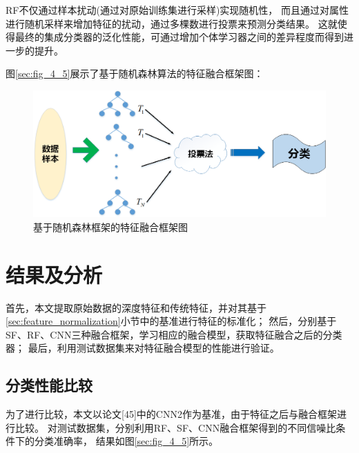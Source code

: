 RF不仅通过样本扰动(通过对原始训练集进行采样)实现随机性，
而且通过对属性进行随机采样来增加特征的扰动，通过多棵数进行投票来预测分类结果。
这就使得最终的集成分类器的泛化性能，可通过增加个体学习器之间的差异程度而得到进一步的提升。\par
图\ref{sec:fig_4_5}展示了基于随机森林算法的特征融合框架图：
\begin{figure}[!h]
	\centering
	\includegraphics[scale=0.5]{figures/chapter_4/fig_4_4}
	\caption{基于随机森林框架的特征融合框架图}\label{sec:fig_4_4}
\end{figure}

\section{结果及分析}
首先，本文提取原始数据的深度特征和传统特征，并对其基于\ref{sec:feature_normalization}小节中的基准进行特征的标准化；
然后，分别基于SF、RF、CNN三种融合框架，学习相应的融合模型，获取特征融合之后的分类器；
最后，利用测试数据集来对特征融合模型的性能进行验证。\par

\subsection{分类性能比较}

为了进行比较，本文以论文[45]中的CNN2作为基准，由于特征之后与融合框架进行比较。
对测试数据集，分别利用RF、SF、CNN融合框架得到的不同信噪比条件下的分类准确率，
结果如图\ref{sec:fig_4_5}所示。\par

